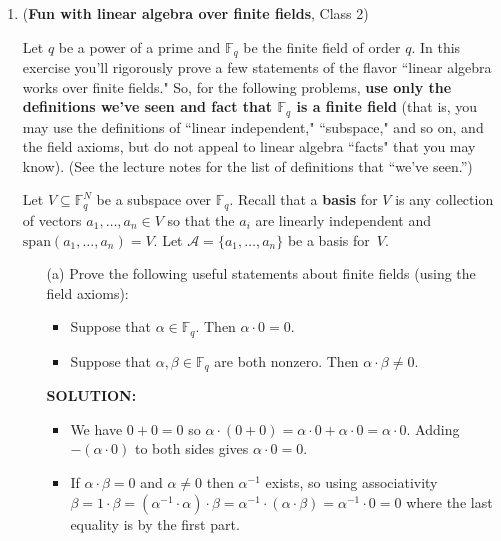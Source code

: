 \documentclass{article}
\newcommand{\FF}{\mathbb{F}}
\newcommand{\spn}{\mathrm{span}}
\begin{document}
\begin{enumerate}



\item (\textbf{Fun with linear algebra over finite fields}, Class 2) 


Let $q$ be a power of a prime and $\FF_q$ be the finite field of order $q$.
In this exercise you'll rigorously prove a few statements of the flavor ``linear algebra works over finite fields."  So, for the following problems, \textbf{use only the definitions we've seen and fact that $\FF_q$ is a finite field} (that is, you may use the definitions of ``linear independent," ``subspace," and so on, and the field axioms, but do not appeal to linear algebra ``facts" that you may know).  (See the lecture notes for the list of definitions that ``we've seen.'')


Let $V \subseteq \FF_q^N$ be a subspace over $\FF_q$.  
Recall that a \textbf{basis} for $V$ is any collection of vectors $a_1,\ldots,a_n \in V$ so that the $a_i$ are linearly independent and $\spn(a_1,\ldots,a_n) = V$.
Let $\mathcal{A} = \{a_1,\ldots,a_n\}$ be a basis for~$V$.

\begin{enumerate}
\item[(a)] Prove the following useful statements about finite fields (using the field axioms):
\begin{itemize}
\item Suppose that $\alpha \in \FF_q$.  Then $\alpha \cdot 0 = 0$.
\item Suppose that $\alpha, \beta \in \FF_q$ are both nonzero.  Then $\alpha \cdot \beta \neq 0$.
\end{itemize}

\begin{shaded}
\textbf{SOLUTION:}
\begin{itemize}
    \item We have $0 + 0 = 0$ so $\alpha \cdot (0 + 0) = \alpha \cdot 0 + \alpha \cdot 0 = \alpha \cdot 0$. Adding $-(\alpha \cdot 0)$ to both sides gives $\alpha \cdot 0 = 0$.
    \item If $\alpha \cdot \beta = 0$ and $\alpha \neq 0$ then $\alpha^{-1}$ exists, so using associativity $\beta = 1 \cdot \beta = (\alpha^{-1} \cdot \alpha) \cdot \beta = \alpha^{-1} \cdot (\alpha \cdot \beta) = \alpha^{-1} \cdot 0 = 0$ where the last equality is by the first part. 
\end{itemize}
\end{shaded}


\end{enumerate}
\end{enumerate}
\end{document}
